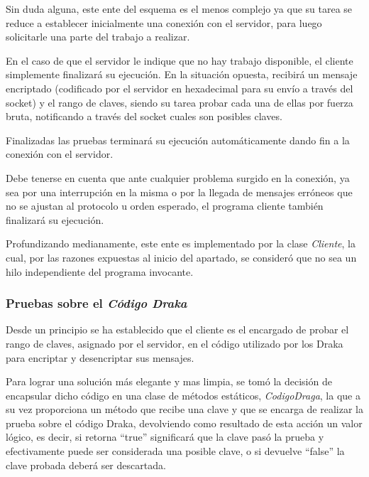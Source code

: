 \documentclass{article}
\begin{document}
	Sin duda alguna, este ente del esquema es el menos complejo ya que su tarea se reduce a establecer inicialmente una conexión con el servidor, para luego solicitarle una parte del trabajo a realizar.
	\par
	En el caso de que el servidor le indique que no hay trabajo disponible, el cliente simplemente finalizará su ejecución. En la situación opuesta, recibirá un mensaje encriptado (codificado por el servidor en hexadecimal para su envío a través del socket) y el rango de claves, siendo su tarea probar cada una de ellas por fuerza bruta, notificando a través del socket cuales son posibles claves.
	\par
	Finalizadas las pruebas terminará su ejecución automáticamente dando fin a la conexión con el servidor.
	\par
	Debe tenerse en cuenta que ante cualquier problema surgido en la conexión, ya sea por una interrupción en la misma o por la llegada de mensajes erróneos que no se ajustan al protocolo u orden esperado, el programa cliente también finalizará su ejecución.
	\par
	Profundizando medianamente, este ente es implementado por la clase \textit{Cliente}, la cual, por las razones expuestas al inicio del apartado, se consideró que no sea un hilo independiente del programa invocante.
	\bigskip



\subsubsection{Pruebas sobre el \textit{Código Draka}}

	Desde un principio se ha establecido que el cliente es el encargado de probar el rango de claves, asignado por el servidor, en el código utilizado por los Draka para encriptar y desencriptar sus mensajes.
	\par
	Para lograr una solución más elegante y mas limpia, se tomó la decisión de encapsular dicho código en una clase de métodos estáticos, \textit{CodigoDraga}, la que a su vez proporciona un método que recibe una clave y que se encarga de realizar la prueba sobre el código Draka, devolviendo como resultado de esta acción un valor lógico, es decir, si retorna ``true'' significará que la clave pasó la prueba y efectivamente puede ser considerada una posible clave, o si devuelve ``false'' la clave probada deberá ser descartada.
	\bigskip\bigskip


\end{document}
